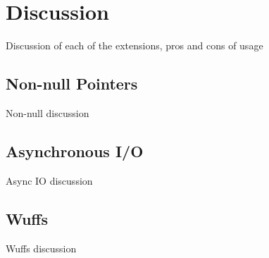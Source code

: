 \documentclass[main.tex]{subfiles}
\begin{document}
\section{Discussion}
Discussion of each of the extensions, pros and cons of usage
\subsection{Non-null Pointers}
Non-null discussion
\subsection{Asynchronous I/O}
Async IO discussion
\subsection{Wuffs}
Wuffs discussion
\end{document}
